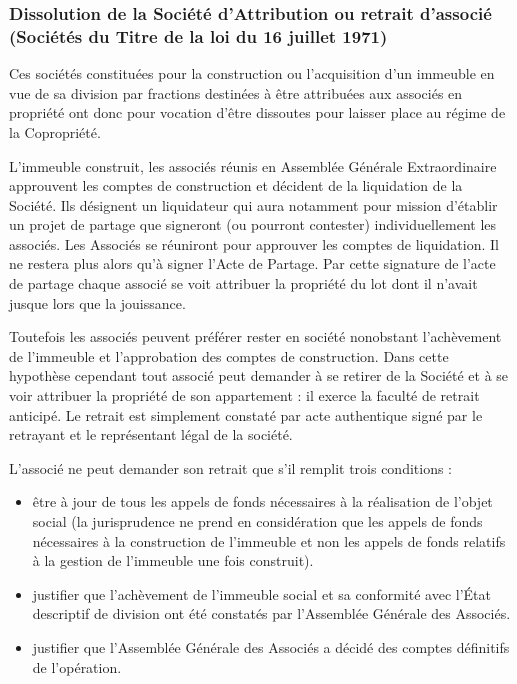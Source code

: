 		\subsubsection{Dissolution de la Société d'Attribution ou retrait d'associé (Sociétés du Titre \II{} de la loi du 16 juillet 1971)}
		
			Ces sociétés constituées pour la construction ou l'acquisition d'un immeuble en vue de sa division par fractions destinées à être attribuées aux associés en propriété ont donc pour vocation d'être dissoutes pour laisser place au régime de la Copropriété.
			
			L'immeuble construit, les associés réunis en Assemblée Générale Extraordinaire approuvent les comptes de construction et décident de la liquidation de la Société. Ils désignent un liquidateur qui aura notamment pour mission d'établir un projet de partage que signeront (ou pourront contester) individuellement les associés. Les Associés se réuniront pour approuver les comptes de liquidation. Il ne restera plus alors qu'à signer l'Acte de Partage. Par cette signature de l'acte de partage chaque associé se voit attribuer la propriété du lot dont il n'avait jusque lors que la jouissance.
			
			Toutefois les associés peuvent préférer rester en société nonobstant l'achèvement de l'immeuble et l'approbation des comptes de construction. Dans cette hypothèse cependant tout associé peut demander à se retirer de la Société et à se voir attribuer la propriété de son appartement : il exerce la faculté de retrait anticipé. Le retrait est simplement constaté par acte authentique signé par le retrayant et le représentant légal de la société.
			
			L'associé ne peut demander son retrait que s'il remplit trois conditions :
			\begin{itemize}
				\item être à jour de tous les appels de fonds nécessaires à la réalisation de l'objet social (la jurisprudence ne prend en considération que les appels de fonds nécessaires à la construction de l’immeuble et non les appels de fonds relatifs à la gestion de l’immeuble une fois construit).
				\item justifier que l'achèvement de l'immeuble social et sa conformité avec l’État descriptif de division ont été constatés par l'Assemblée Générale des Associés.
				\item justifier que l'Assemblée Générale des Associés a décidé des comptes définitifs de l'opération.
			\end{itemize}
			
